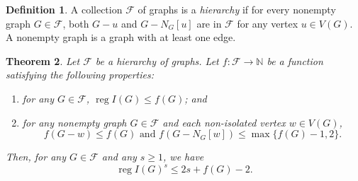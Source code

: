 \documentclass[10pt]{amsart}
\newtheorem{theo}{Theorem}[section]
\theoremstyle{definition}
\newtheorem{defi}[theo]{Definition}
\DeclareMathOperator{\reg}{reg}
\newcommand{\NN}{{\mathbb N}}
\newcommand{\F}{\mathcal{F}}
\begin{document}
\begin{defi}
A collection $\F$ of graphs is a \emph{hierarchy} if for every nonempty graph $G \in \F$, both $G - u$ and $G - N_G[u]$ are in $\F$ for any vertex $u \in V(G)$. A nonempty graph is a graph with at least one edge.
\end{defi}
\begin{theo} \label{thm.hierarchy}
Let $\F$ be a hierarchy of graphs. Let $f : \F \longrightarrow \NN$ be a function satisfying the following properties:
\begin{enumerate}
\item\label{theo3.3_1} for any $G \in \F$, $\reg I(G) \le f(G)$; and
\item\label{theo3.3_2} for any nonempty graph $G \in \F$ and each non-isolated vertex $w \in V(G)$,
 \[
f(G-w) \le f(G) \text{ and } f(G - N_G[w]) \le \max\{f(G)-1, 2\}.
\]

\end{enumerate}
Then, for any $G \in \F$ and any $s \ge 1$, we have
\[
\reg I(G)^s \le 2s + f(G) - 2.
\]

\end{theo}
\end{document}
